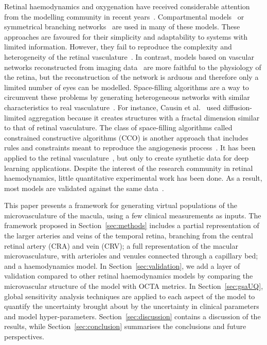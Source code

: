 \documentclass[11pt,]{article}
\begin{document}
Retinal haemodynamics and oxygenation have received considerable
attention from the modelling community in recent
years~\cite{Arciero2008,Bernabeu2014,Causin2016,Chiaravalli2022,DoblhoffDier2014,
  Fry2020,Guidoboni2014,Hernandez2023,Takahashi2009,Zhu2019,Yu2019}.
Compartmental models~\cite{Arciero2008,Guidoboni2014,Chiaravalli2022}
or symmetrical branching
networks~\cite{Chiaravalli2022,Takahashi2009,Zhu2019} are used in many
of these models. These approaches are favoured for their simplicity
and adaptability to systems with limited information. However, they
fail to reproduce the complexity and heterogeneity of the retinal
vasculature~\cite{Yu2019}. In contrast, models based on vascular
networks reconstructed from imaging data~\cite{Bernabeu2014,Fry2020}
are more faithful to the physiology of the retina, but the
reconstruction of the network is arduous and therefore only a limited
number of eyes can be modelled. Space-filling algorithms are a way to
circumvent these problems by generating heterogeneous networks with
similar characteristics to real
vasculature~\cite{Causin2016,Linninger2013,Talou2021}. For instance,
Causin et al.~\cite{Causin2016} used diffusion-limited aggregation because it creates structures with a fractal dimension similar to that of retinal vasculature.
The class of space-filling algorithms called constrained constructive algorithms
(CCO) is another approach that includes rules and constraints meant to
reproduce the angiogenesis process~\cite{Linninger2013,Talou2021}. It
has been applied to the retinal
vasculature~\cite{Brown2023,LoCastro2020}, but only to create
synthetic data for deep learning applications. Despite the interest of
the research community in retinal haemodynamics, little quantitative
experimental work has been done. As a result, most models are
validated against the same data~\cite{DoblhoffDier2014,Riva1985}.

This paper presents a framework for generating virtual populations of
the microvasculature of the macula, using a few clinical measurements as
inputs. The framework proposed in Section~\ref{sec:methods} includes a
partial representation of the larger arteries and veins of the
temporal retina, branching from the central retinal artery (CRA) and
vein (CRV); a full representation of the macular microvasculature,
with arterioles and venules connected through a capillary bed; and a
haemodynamics model. In Section~\ref{sec:validation}, we add a layer
of validation compared to other retinal haemodynamics models by
comparing the microvascular structure of the model with OCTA
metrics. In Section~\ref{sec:gsaUQ}, global sensitivity analysis
techniques are applied to each aspect of the model to
quantify the uncertainty brought about by the uncertainty in clinical
parameters and model hyper-parameters. Section~\ref{sec:discussion}
contains a discussion of the results, while
Section~\ref{sec:conclusion} summarises the conclusions and future
perspectives.
\end{document}
